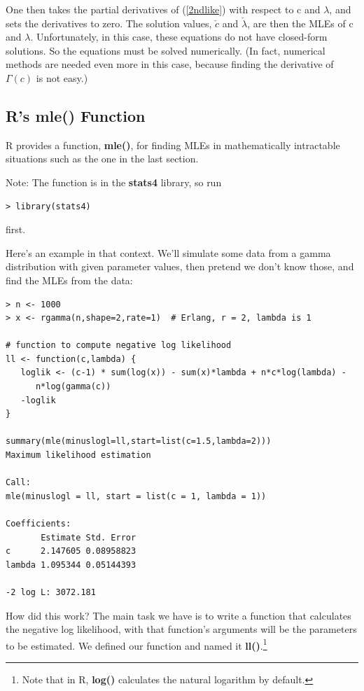 One then takes the partial derivatives of (\ref{2ndlike}) with respect
to c and $\lambda$, and sets the derivatives to zero.  The solution
values, $\check{c}$ and $\check{\lambda}$, are then the MLEs of c and
$\lambda$.  Unfortunately, in this case, these equations do not have
closed-form solutions.  So the equations must be solved numerically.
(In fact, numerical methods are needed even more in this case, because
finding the derivative of $\Gamma(c)$ is not easy.)  

\subsection{R's mle() Function}

R provides a function, {\bf mle()}, for finding MLEs in mathematically
intractable situations such as the one in the last section.  

Note:  The function is in the {\bf stats4} library, so run

\begin{lstlisting}
> library(stats4)
\end{lstlisting}

first.

Here's an example in that context.  We'll simulate some data from a
gamma distribution with given parameter values, then pretend we don't
know those, and find the MLEs from the data:

\begin{Verbatim}[fontsize=\relsize{-2}]
> n <- 1000
> x <- rgamma(n,shape=2,rate=1)  # Erlang, r = 2, lambda is 1

# function to compute negative log likelihood
ll <- function(c,lambda) {
   loglik <- (c-1) * sum(log(x)) - sum(x)*lambda + n*c*log(lambda) -
      n*log(gamma(c))
   -loglik
}

summary(mle(minuslogl=ll,start=list(c=1.5,lambda=2)))
Maximum likelihood estimation

Call:
mle(minuslogl = ll, start = list(c = 1, lambda = 1))

Coefficients:
       Estimate Std. Error
c      2.147605 0.08958823
lambda 1.095344 0.05144393

-2 log L: 3072.181 
\end{Verbatim}

How did this work?  The main task we have is to write a function that
calculates the negative log likelihood, with that function's arguments
will be the parameters to be estimated.  We defined our function and
named it {\bf ll()}.\footnote{Note that in R, {\bf log()} calculates the
natural logarithm by default.}

